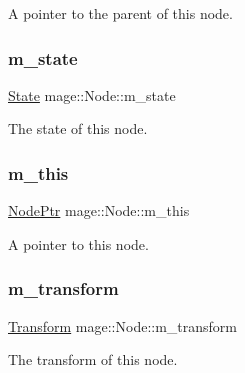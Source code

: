 A pointer to the parent of this node. \hypertarget{classmage_1_1_node_a76b775e32bb001c54a9927461eaf7926}{}\label{classmage_1_1_node_a76b775e32bb001c54a9927461eaf7926} 
\subsubsection{\texorpdfstring{m\+\_\+state}{m\_state}}
{\footnotesize\ttfamily \hyperlink{namespacemage_a8159a53ed2ac3a0fe7058b2a051fa969}{State} mage\+::\+Node\+::m\+\_\+state\hspace{0.3cm}{\ttfamily [private]}}

The state of this node. \hypertarget{classmage_1_1_node_ab056e1563dca22433efa152f4b6da46f}{}\label{classmage_1_1_node_ab056e1563dca22433efa152f4b6da46f} 
\subsubsection{\texorpdfstring{m\+\_\+this}{m\_this}}
{\footnotesize\ttfamily \hyperlink{classmage_1_1_node_ac575dc006e0ae1134277ade977dc06b6}{Node\+Ptr} mage\+::\+Node\+::m\+\_\+this\hspace{0.3cm}{\ttfamily [private]}}

A pointer to this node. \hypertarget{classmage_1_1_node_a0f4dd0c46d9713fd64b0e562862afac6}{}\label{classmage_1_1_node_a0f4dd0c46d9713fd64b0e562862afac6} 
\subsubsection{\texorpdfstring{m\+\_\+transform}{m\_transform}}
{\footnotesize\ttfamily \hyperlink{classmage_1_1_transform}{Transform} mage\+::\+Node\+::m\+\_\+transform\hspace{0.3cm}{\ttfamily [private]}}

The transform of this node. 